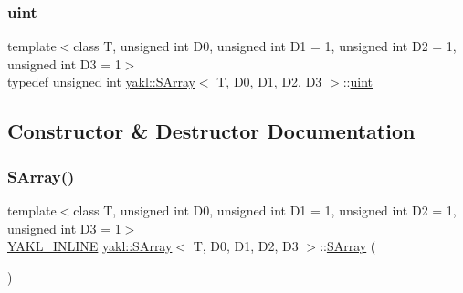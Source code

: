 \subsubsection{\texorpdfstring{uint}{uint}}
{\footnotesize\ttfamily template$<$class T, unsigned int D0, unsigned int D1 = 1, unsigned int D2 = 1, unsigned int D3 = 1$>$ \\
typedef unsigned int \hyperlink{classyakl_1_1SArray}{yakl\+::\+S\+Array}$<$ T, D0, D1, D2, D3 $>$\+::\hyperlink{classyakl_1_1SArray_a777ad93441c16e786309b27e40bc56f0}{uint}\hspace{0.3cm}{\ttfamily [protected]}}



\subsection{Constructor \& Destructor Documentation}
\mbox{\label{classyakl_1_1SArray_aa085eb4d1db8000c7460ff7d4ca7e77a}} 
\subsubsection{\texorpdfstring{S\+Array()}{SArray()}\hspace{0.1cm}{\footnotesize\ttfamily [1/3]}}
{\footnotesize\ttfamily template$<$class T, unsigned int D0, unsigned int D1 = 1, unsigned int D2 = 1, unsigned int D3 = 1$>$ \\
\hyperlink{YAKL_8h_aa0dd629ffce6d564b19e9313fb91a5ad}{Y\+A\+K\+L\+\_\+\+I\+N\+L\+I\+NE} \hyperlink{classyakl_1_1SArray}{yakl\+::\+S\+Array}$<$ T, D0, D1, D2, D3 $>$\+::\hyperlink{classyakl_1_1SArray}{S\+Array} (\begin{DoxyParamCaption}{ }\end{DoxyParamCaption})\hspace{0.3cm}{\ttfamily [inline]}}

\mbox{\label{classyakl_1_1SArray_ab4161adb9402e19cc7389cd2927bf7b4}} 

